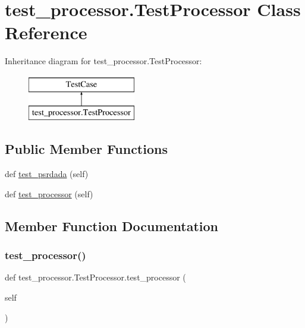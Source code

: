 \hypertarget{classtest__processor_1_1_test_processor}{}\section{test\+\_\+processor.\+Test\+Processor Class Reference}
\label{classtest__processor_1_1_test_processor}
Inheritance diagram for test\+\_\+processor.\+Test\+Processor\+:\begin{figure}[H]
\begin{center}
\leavevmode
\includegraphics[height=2.000000cm]{classtest__processor_1_1_test_processor}
\end{center}
\end{figure}
\subsection*{Public Member Functions}
\begin{DoxyCompactItemize}
\item 
def \mbox{\hyperlink{classtest__processor_1_1_test_processor_ad54549f2072bf9c895bdd3d466cd4e77}{test\+\_\+psrdada}} (self)
\item 
def \mbox{\hyperlink{classtest__processor_1_1_test_processor_a581914ecc24c8348b6102cf53d9ad9fa}{test\+\_\+processor}} (self)
\end{DoxyCompactItemize}


\subsection{Member Function Documentation}
\mbox{\label{classtest__processor_1_1_test_processor_a581914ecc24c8348b6102cf53d9ad9fa}} 
\subsubsection{\texorpdfstring{test\_processor()}{test\_processor()}}
{\footnotesize\ttfamily def test\+\_\+processor.\+Test\+Processor.\+test\+\_\+processor (\begin{DoxyParamCaption}\item[{}]{self }\end{DoxyParamCaption})}


